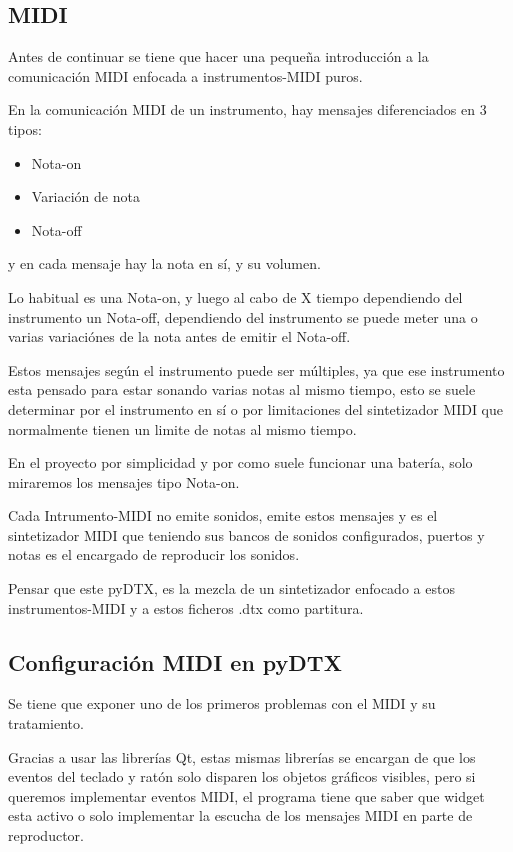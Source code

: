 \documentclass[a4paper,11pt,oneside]{book}
\begin{document}
\subsection{MIDI} 
Antes de continuar se tiene que hacer una pequeña introducción a la comunicación MIDI enfocada a instrumentos-MIDI puros.

En la comunicación MIDI de un instrumento, hay mensajes diferenciados en 3 tipos:

\begin{itemize}
   \item Nota-on
   \item Variación de nota
   \item Nota-off
 \end{itemize}
 
y en cada mensaje hay la nota en sí, y su volumen.
 
Lo habitual es una Nota-on, y luego al cabo de X tiempo dependiendo del instrumento un Nota-off, dependiendo del instrumento se puede meter una o varias variaciónes de la nota antes de emitir el Nota-off.

Estos mensajes según el instrumento puede ser múltiples, ya que ese instrumento esta pensado para estar sonando varias notas al mismo tiempo, esto se suele determinar por el instrumento en sí  o por limitaciones del sintetizador MIDI que normalmente tienen un limite de notas al mismo tiempo.

En el proyecto por simplicidad y por como suele funcionar una batería, solo miraremos los mensajes tipo Nota-on.

Cada Intrumento-MIDI no emite sonidos, emite estos mensajes y es el sintetizador MIDI que teniendo sus bancos de sonidos configurados, puertos y notas es el encargado de reproducir los sonidos.

Pensar que este pyDTX, es la mezcla de un sintetizador enfocado a estos instrumentos-MIDI y a estos ficheros .dtx como partitura.

\subsection{Configuración MIDI en pyDTX}
Se tiene que exponer uno de los primeros problemas con el MIDI y su tratamiento.

Gracias a usar las librerías Qt, estas mismas librerías se encargan de que los eventos del teclado y ratón solo disparen los objetos gráficos visibles, pero si queremos implementar eventos MIDI, el programa tiene que saber que widget esta activo o solo implementar la escucha de los mensajes MIDI en parte de reproductor.
\end{document}

